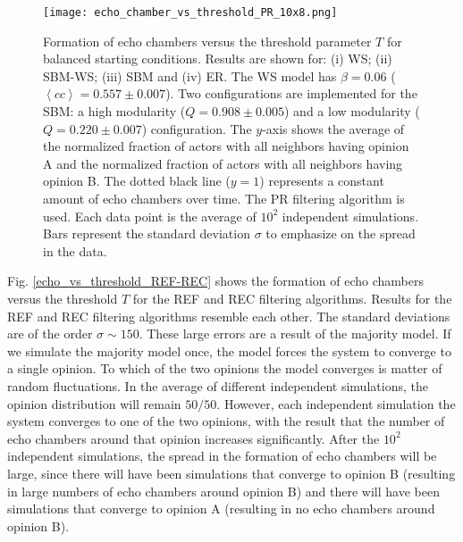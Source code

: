 \documentclass[11 pt , letterpaper , twoside , openright]{book}
\begin{document}
\begin{figure}[H]
	\texttt{[image: echo\_chamber\_vs\_threshold\_PR\_10x8.png]}
	\captionsetup{format=plain}
	\caption[Formation of echo chambers versus the threshold parameter $T$, for balanced starting conditions. The PR filtering algorithm is used and the majority threshold model is implemented.]{Formation of echo chambers versus the threshold parameter $T$ for balanced starting conditions. Results are shown for: (i) WS; (ii) SBM-WS; (iii) SBM and (iv) ER. The WS model has $\beta = 0.06$ ($\left<cc\right> = 0.557 \pm 0.007$). Two configurations are implemented for the SBM: a high modularity ($Q = 0.908 \pm 0.005$) and a low modularity ($Q = 0.220 \pm 0.007$) configuration. The $y$-axis shows the average of the normalized fraction of actors with all neighbors having opinion A and the normalized fraction of actors with all neighbors having opinion B. The dotted black line ($y=1$) represents a constant amount of echo chambers over time. The PR filtering algorithm is used. Each data point is the average of $10^2$ independent simulations. Bars represent the standard deviation $\sigma$ to emphasize on the spread in the data.}
\label{echo_vs_threshold_PR}
\end{figure}
\noindent
Fig. \ref{echo_vs_threshold_REF-REC} shows the formation of echo chambers versus the threshold $T$ for the REF and REC filtering algorithms. Results for the REF and REC filtering algorithms resemble each other. The standard deviations are of the order $\sigma \sim 150$. These large errors are a result of the majority model. If we simulate the majority model once, the model forces the system to converge to a single opinion. To which of the two opinions the model converges is matter of random fluctuations. In the average of different independent simulations, the opinion distribution will remain $50/50$. However, each independent simulation the system converges to one of the two opinions, with the result that the number of echo chambers around that opinion increases significantly. After the $10^2$ independent simulations, the spread in the formation of echo chambers will be large, since there will have been simulations that converge to opinion B (resulting in large numbers of echo chambers around opinion B) and there will have been simulations that converge to opinion A (resulting in no echo chambers around opinion B).
\end{document}
